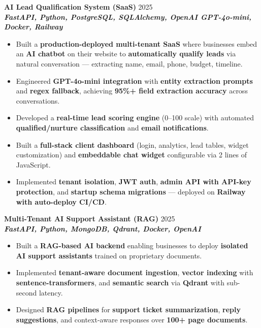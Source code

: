 \documentclass[letterpaper,11pt]{article}
\begin{document}
\textbf{AI Lead Qualification System (SaaS)} \href{https://github.com/PawanYadavv/ai-lead-qualification-system}{\faGithub} \href{https://ai-lead-qualification-system-production.up.railway.app/dashboard}{\faExternalLink} \hfill 2025 \\
\emph{\textbf{FastAPI, Python, PostgreSQL, SQLAlchemy, OpenAI GPT-4o-mini, Docker, Railway}}
\begin{itemize}
\item Built a \textbf{production-deployed multi-tenant SaaS} where businesses embed an \textbf{AI chatbot} on their website to \textbf{automatically qualify leads} via natural conversation — extracting name, email, phone, budget, timeline.
\item Engineered \textbf{GPT-4o-mini integration} with \textbf{entity extraction prompts} and \textbf{regex fallback}, achieving \textbf{95\%+ field extraction accuracy} across conversations.
\item Developed a \textbf{real-time lead scoring engine} (0--100 scale) with automated \textbf{qualified/nurture classification} and \textbf{email notifications}.
\item Built a \textbf{full-stack client dashboard} (login, analytics, lead tables, widget customization) and \textbf{embeddable chat widget} configurable via 2 lines of JavaScript.
\item Implemented \textbf{tenant isolation}, \textbf{JWT auth}, \textbf{admin API with API-key protection}, and \textbf{startup schema migrations} — deployed on \textbf{Railway with auto-deploy CI/CD}.
\end{itemize}

\textbf{Multi-Tenant AI Support Assistant (RAG)} \href{https://github.com/PawanYadavv/multitenant}{\faGithub} \hfill 2025 \\
\emph{\textbf{FastAPI, Python, MongoDB, Qdrant, Docker, OpenAI}}
\begin{itemize}
\item Built a \textbf{RAG-based AI backend} enabling businesses to deploy \textbf{isolated AI support assistants} trained on proprietary documents.
\item Implemented \textbf{tenant-aware document ingestion}, \textbf{vector indexing} with \textbf{sentence-transformers}, and \textbf{semantic search} via \textbf{Qdrant} with sub-second latency.
\item Designed \textbf{RAG pipelines} for \textbf{support ticket summarization}, \textbf{reply suggestions}, and context-aware responses over \textbf{100+ page documents}.
\end{itemize}
\end{document}

